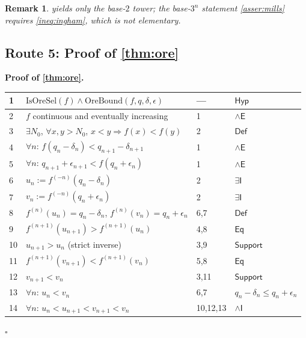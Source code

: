 \documentclass[11pt,reqno]{amsart}
\theoremstyle{blueplain}
\newtheorem{remark}{Remark}[section]
\renewcommand{\qedsymbol}{\textcolor{proofqed}{\ensuremath{\square}}}
\renewenvironment{proof}[1][Proof]{\par\noindent\textbf{\textcolor{proofhead}{#1.}}\par\nobreak}{\par\nobreak\hfill\qedsymbol}
\newcounter{asser}
\numberwithin{equation}{section}
\begin{document}
\begin{remark}
	{\scriptsize {} yields only the base-$2$ tower; the base-$3^{n}$ statement \cref{asser:mills} requires \cref{ineq:ingham}, which is not elementary. }
\end{remark}

\subsection{Route 5: Proof of \cref{thm:ore}}

\begin{proof}[\textbf{Proof of \cref{thm:ore}}]
	\label{proof:ore}
	{\scriptsize
		\begin{tabular}{|m{0.7cm}|m{12cm}|m{1.4cm}|m{2.5cm}|}
			\hline
			1 & $\mathrm{IsOreSel}(f)\wedge\mathrm{OreBound}(f,q,\delta,\epsilon)$ & --- & $\mathsf{Hyp}$ \\ \hline
			2 & $f$ continuous and eventually increasing & 1 & $\wedge\mathsf{E}$ \\ \hline
			3 & $\exists N_0$, $\forall x,y>N_0$, $x<y\Rightarrow f(x)<f(y)$ & 2 & $\mathsf{Def}$ \\ \hline
			4 & $\forall n$: $f(q_n-\delta_n)<q_{n+1}-\delta_{n+1}$ & 1 & $\wedge\mathsf{E}$ \\ \hline
			5 & $\forall n$: $q_{n+1}+\epsilon_{n+1}<f(q_n+\epsilon_n)$ & 1 & $\wedge\mathsf{E}$ \\ \hline
			6 & $u_n:=f^{(-n)}(q_n-\delta_n)$ & 2 & $\exists\mathsf{I}$ \\ \hline
			7 & $v_n:=f^{(-n)}(q_n+\epsilon_n)$ & 2 & $\exists\mathsf{I}$ \\ \hline
			8 & $f^{(n)}(u_n)=q_n-\delta_n$, $f^{(n)}(v_n)=q_n+\epsilon_n$ & 6,7 & $\mathsf{Def}$ \\ \hline
			9 & $f^{(n+1)}(u_{n+1})>f^{(n+1)}(u_n)$ & 4,8 & $\mathsf{Eq}$ \\ \hline
			10 & $u_{n+1}>u_n$ (strict inverse) & 3,9 & $\mathsf{Support}$ \\ \hline
			11 & $f^{(n+1)}(v_{n+1})<f^{(n+1)}(v_n)$ & 5,8 & $\mathsf{Eq}$ \\ \hline
			12 & $v_{n+1}<v_n$ & 3,11 & $\mathsf{Support}$ \\ \hline
			13 & $\forall n$: $u_n<v_n$ & 6,7 & $q_n-\delta_n\le q_n+\epsilon_n$ \\ \hline
			14 & $\forall n$: $u_n<u_{n+1}<v_{n+1}<v_n$ & 10,12,13 & $\wedge\mathsf{I}$ \\ \hline

\end{tabular}}
\end{proof}
\end{document}

